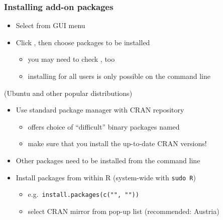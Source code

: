 \documentclass[t]{beamer} %
\begin{document}
\begin{frame}
  \frametitle{Installing add-on packages}

  \begin{itemize}
  \item Select  from GUI menu
  \item Click , then choose packages to be installed
    \begin{itemize}
    \item you may need to check , too
    \item installing for all users is only possible on the command line
    \end{itemize}
  \end{itemize}

   (Ubuntu and other popular distributions)
  \begin{itemize}
  \item Use standard package manager with CRAN repository
    \begin{itemize}
    \item offers choice of ``difficult'' binary packages named 
    \item make sure that you install the up-to-date CRAN versions!
    \end{itemize}
  \item Other packages need to be installed from the command line
  \end{itemize}
  
  \begin{itemize}
  \item Install packages from within R (system-wide with \texttt{sudo R})
    \begin{itemize}
    \item e.g.\ \texttt{install.packages(c("", ""))}
    \item select CRAN mirror from pop-up list (recommended: Austria)
    \end{itemize}
  \end{itemize}
\end{frame}
\end{document}
